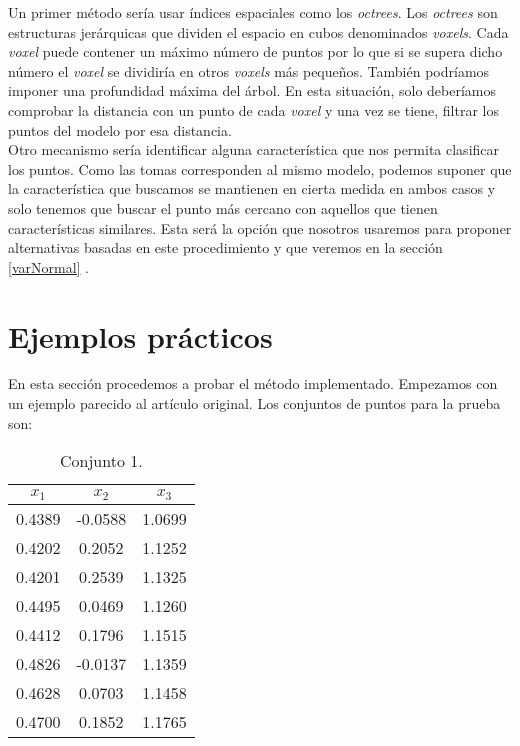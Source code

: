 Un primer método sería usar índices espaciales como los \textit{octrees}. Los \textit{octrees} son estructuras jerárquicas que dividen el espacio en cubos denominados \textit{voxels}. Cada \textit{voxel} puede contener un máximo número de puntos por lo que si se supera dicho número el \textit{voxel} se dividiría en otros \textit{voxels} más pequeños. También podríamos imponer una profundidad máxima del árbol. En esta situación, solo deberíamos comprobar la distancia con un punto de cada \textit{voxel} y una vez se tiene, filtrar los puntos del modelo por esa distancia. \\

Otro mecanismo sería identificar alguna característica que nos permita clasificar los puntos. Como las tomas corresponden al mismo modelo, podemos suponer que la característica que buscamos se mantienen en cierta medida en ambos casos y solo tenemos que buscar el punto más cercano con aquellos que tienen características similares. Esta será la opción que nosotros usaremos para proponer alternativas basadas en este procedimiento y que veremos en la sección \ref{varNormal} .
\bigskip

\section{Ejemplos prácticos}\label{ejemPrac1}
En esta sección procedemos a probar el método implementado. Empezamos con un ejemplo parecido al artículo original. Los conjuntos de puntos para la prueba son:

\begin{table}[h!]
	\centering
	\begin{tabular}{| c | c | c |} 
		\hline
		$ x_1 $ & $ x_2 $ & $ x_3 $ \\
		\hline
		0.4389 & -0.0588 & 1.0699 \\ 
		0.4202 & 0.2052 & 1.1252 \\
		0.4201 &0.2539 & 1.1325 \\
		0.4495 & 0.0469 & 1.1260  \\
		0.4412 & 0.1796 & 1.1515 \\
		0.4826 & -0.0137 & 1.1359  \\
		0.4628 & 0.0703 & 1.1458 \\
		0.4700 & 0.1852 & 1.1765 \\
		\hline
	\end{tabular}
	\caption{Conjunto 1.}
	\label{table:1}
\end{table}

